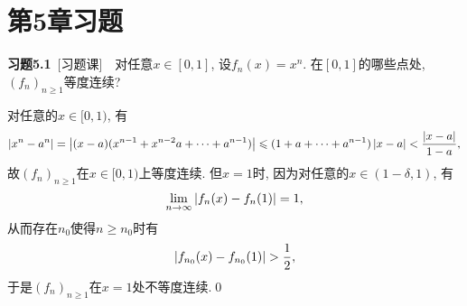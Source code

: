 \section{第5章习题}

	\textbf{习题5.1}\ [习题课]\ \ 对任意$ x\in[0,1] $, 设$ f_n(x)=x^n $. 在$ [0,1] $的哪些点处, $ (f_n)_{n\geqslant 1} $等度连续?
	\begin{Proof}
	对任意的$ x\in[0,1) $, 有
	\[
	\left| x^n-a^n \right| =\left| (x-a)(x^{n-1}+x^{n-2}a+\cdots+a^{n-1}) \right| \leqslant(1+a+\cdots+a^{n-1})\left| x-a \right| <\frac{\left| x-a \right| }{1-a},
	\]
	故$ (f_n)_{n\geqslant 1} $在$ x\in[0,1) $上等度连续. 但$ x=1 $时, 因为对任意的$ x\in(1-\delta,1) $, 有
	\[
	\lim_{n\to\infty}\left| f_n(x)-f_n(1) \right| =1,
	\]
	从而存在$ n_0 $使得$ n\geqslant n_0 $时有
	\[
	\left| f_{n_0}(x)-f_{n_0}(1) \right| >\frac{1}{2},
	\]
	于是$ (f_n)_{n\geqslant 1} $在$ x=1 $处不等度连续.\qed
	\end{Proof}

